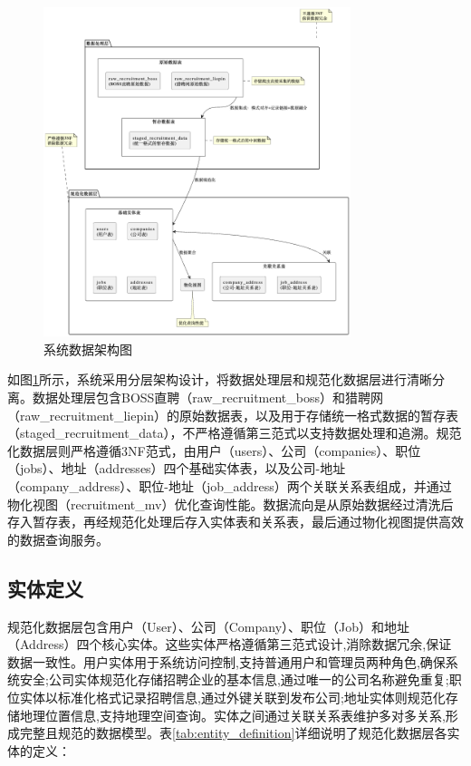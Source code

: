 \begin{figure}[htbp]
  \centering
  \includegraphics[width=0.8\textwidth]{figures/数据库概念设计.png}
  \caption{系统数据架构图}
  \label{fig:data_architecture}
\end{figure}

如图\ref{fig:data_architecture}所示，系统采用分层架构设计，将数据处理层和规范化数据层进行清晰分离。数据处理层包含BOSS直聘（raw\_recruitment\_boss）和猎聘网（raw\_recruitment\_liepin）的原始数据表，以及用于存储统一格式数据的暂存表（staged\_recruitment\_data），不严格遵循第三范式以支持数据处理和追溯。规范化数据层则严格遵循3NF范式，由用户（users）、公司（companies）、职位（jobs）、地址（addresses）四个基础实体表，以及公司-地址（company\_address）、职位-地址（job\_address）两个关联关系表组成，并通过物化视图（recruitment\_mv）优化查询性能。数据流向是从原始数据经过清洗后存入暂存表，再经规范化处理后存入实体表和关系表，最后通过物化视图提供高效的数据查询服务。


\subsection{实体定义}
规范化数据层包含用户（User）、公司（Company）、职位（Job）和地址（Address）四个核心实体。这些实体严格遵循第三范式设计,消除数据冗余,保证数据一致性。用户实体用于系统访问控制,支持普通用户和管理员两种角色,确保系统安全;公司实体规范化存储招聘企业的基本信息,通过唯一的公司名称避免重复;职位实体以标准化格式记录招聘信息,通过外键关联到发布公司;地址实体则规范化存储地理位置信息,支持地理空间查询。实体之间通过关联关系表维护多对多关系,形成完整且规范的数据模型。表\ref{tab:entity_definition}详细说明了规范化数据层各实体的定义：

